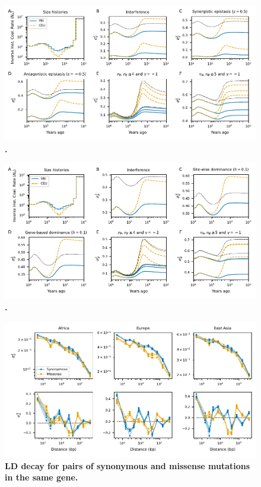 \documentclass[]{article}
\begin{document}
\begin{figure}[ht!]
    \centering
    \includegraphics{../figures/demog_YRI_CEU.sd2}
    \caption{
        \textbf{.}
    }
    \label{fig:relate_sd2}
\end{figure}

\begin{figure}[ht!]
    \centering
    \includegraphics{../figures/demog_YRI_CEU.dominance.sd2}
    \caption{
        \textbf{.}
    }
    \label{fig:relate_dom_sd2}
\end{figure}

\begin{figure}[ht!]
    \centering
    \includegraphics{../figures/ld_decay_gene_wide}
    \caption{
        \textbf{LD decay for pairs of synonymous and missense mutations
        in the same gene.}
    }
    \label{fig:LDgene}
\end{figure}
\end{document}
